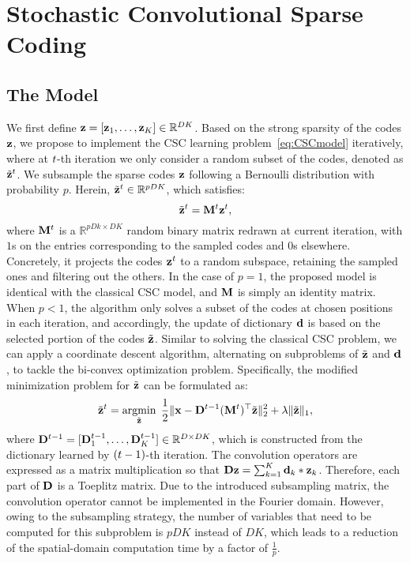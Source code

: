 \section{Stochastic Convolutional Sparse Coding}
\subsection{The Model}
We first define $\code = [\code_1, \dots, \code_K] \in \mathbb{R}^{DK}$.
Based on the strong sparsity of the codes $\code$, we propose to
implement the CSC learning problem~\eqref{eq:CSCmodel} iteratively,
where at $t$-th iteration we only consider a random subset of the codes, denoted as $\subcode^t$.
We subsample the sparse codes $\code$ following a Bernoulli distribution with
probability $p$. Herein, $\subcode^t \in \mathbb{R}^{pDK}$, which satisfies:
\begin{equation}
    \subcode^t = \mask^{\ite} \code^\ite,
\end{equation}
where $\mask^{\ite}$ is a $\mathbb{R}^{pDk \times DK}$ random binary matrix redrawn at current iteration, with $1$s on the entries corresponding to the sampled codes and $0$s elsewhere. Concretely, it projects the codes $\code^\ite$ to a random subspace, retaining the sampled ones and filtering out the others. In the case of $p=1$, the proposed model is identical with the classical CSC model, and $\mask$ is simply an identity matrix. When $p<1$, the algorithm only solves a subset of the codes at chosen positions in each iteration, and accordingly, the update of dictionary $\filter$ is based on the selected
portion of the codes $\subcode$. Similar to solving the classical CSC problem, we can apply a coordinate descent algorithm, alternating on
subproblems of $\subcode$ and $\filter$, to tackle the bi-convex optimization problem. Specifically, the modified
minimization problem for $\subcode$ can be formulated as:
\begin{equation} \label{eq:updatingCode}
    \subcode^{\ite} = \minimize{\subcode} \frac{1}{2}\| \signal - \Filter^{\ite-1} (\mask^{\ite})^\top \subcode \|_2^2 + \lambda \| \subcode \|_1,
\end{equation}
where $\Filter^{\ite-1} = [\Filter_1^{\ite-1}, \dots, \Filter_K^{\ite-1}] \in \mathbb{R}^{D
  \times DK}$, which is constructed from the dictionary learned by
$(t-1)$-th iteration. The convolution operators are expressed as a matrix
multiplication so that $ \Filter \code = \sum_{k=1}^{K} \filter_k *
\code_k$. Therefore, each part of $\Filter$ is a Toeplitz
matrix. Due to the introduced subsampling matrix, the
convolution operator cannot be implemented in the Fourier
domain. However, owing to the subsampling
strategy, the number of variables that need to be computed for this
subproblem is $pDK$ instead of $DK$, which leads to a reduction
of the spatial-domain computation time by a factor of $\frac{1}{p}$.

